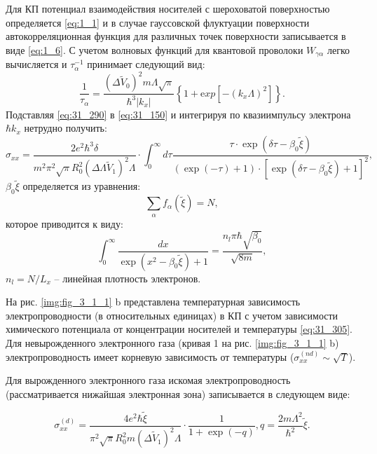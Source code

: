 Для КП потенциал взаимодействия носителей с шероховатой поверхностью определяется \eqref{eq:1_1} 
и в случае гауссовской флуктуации поверхности автокорреляционная функция для различных точек поверхности записывается в виде \eqref{eq:1_6}. С учетом волновых функций для квантовой проволоки \cite{Constantinou1989} $W_{\gamma \alpha } $ легко вычисляется и $\tau _{\alpha }^{-1} $ принимает следующий вид:
\begin{equation} \label{eq:31_290}
\frac{1}{\tau _{\alpha } } =\frac{(\Delta \tilde{V}_{0} )^{2} m\Lambda \sqrt{\pi } }{\hbar ^{3} \left|k_{x} \right|} \left\{{\mathrm 1}+{\mathrm exp}\left[{\mathrm -}\left(k_{x} \Lambda \right)^{2} \right]\right\}.
\end{equation}
Подставляя \eqref{eq:31_290} в \eqref{eq:31_150} и интегрируя по квазиимпульсу электрона $\hbar k_{x} $ нетрудно получить:
\begin{equation} \label{eq:31_300}
\sigma _{xx} =\frac{2e^{2} \hbar ^{3} \delta }{m^{2} \pi ^{2} \sqrt{\pi } R_{0}^{2} \left(\Delta \Lambda \tilde{V}_{1} \right)^{2} \Lambda } \cdot \int _{0}^{\infty }d\tau \frac{\tau \cdot {\exp}\left(\delta \tau -\beta _{0} \tilde{\xi }\right)}{\left(\exp(-\tau )+1\right)\cdot \left[{\exp}\left(\delta \tau -\beta _{0} \tilde{\xi }\right)+1\right]^{2} },
\end{equation}
$\beta _{0} \tilde{\xi }$ определяется из уравнения:
\[
\sum_{\alpha } {f_{\alpha}(\tilde{\xi }) = N},
\]
которое приводится к виду:
\begin{equation} \label{eq:31_305}
\int _{0}^{\infty }\frac{dx}{\exp \left(x^{2} -\beta _{0} \tilde{\xi }\right)+1} =\frac{n_{l} \pi \hbar \sqrt{\beta _{0} } }{\sqrt{8m} },
\end{equation}
$n_{l} =N/L_{x} $ -- линейная плотность электронов.

На рис. \ref{img:fig_3_1_1} b представлена температурная зависимость электропроводности (в относительных единицах) в КП с учетом зависимости химического потенциала от концентрации носителей и температуры \eqref{eq:31_305}. Для невырожденного электронного газа (кривая 1 на рис. \ref{img:fig_3_1_1} b) электропроводность имеет корневую зависимость от температуры ($\sigma _{xx}^{(nd)} \sim \sqrt{T} $).

Для вырожденного электронного газа искомая электропроводность (рассматривается нижайшая электронная зона) записывается в следующем виде:

\begin{equation} \label{eq:31_310}
\sigma _{xx}^{(d)} =\frac{4e^{2} \hbar \tilde{\xi }}{\pi ^{2} \sqrt{\pi } R_{0}^{2} m\left(\Delta \tilde{V}_{1} \right)^{2} \Lambda } \cdot \frac{{\mathrm 1}}{1+{\exp}(-q)} , q=\frac{2m\Lambda ^{2} }{\hbar ^{2} } \tilde{\xi }.  
\end{equation}

